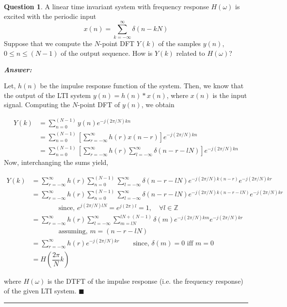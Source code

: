 \documentclass[12pt]{article}
\theoremstyle{definition}
\newtheorem{question}{Question}
\newenvironment{answer}{
    \textbf{\textit{Answer:}} \qquad
}{\hfill $\blacksquare$ \\ \begin{center}
    \rule{0.6\linewidth}{0.5px}    
\end{center}
}
\newcommand{\Z}{\mathbb{Z}}
\begin{document}
\begin{question}
    A linear time invariant system with frequency response $H(\omega)$ is excited with the periodic input 
    $$
    x(n) = \sum_{k = -\infty}^\infty \delta(n - kN)
    $$
    Suppose that we compute the $N$-point DFT $Y(k)$ of the samples $y(n)$, $0 \leq n \leq (N-1)$ of the output sequence. How is $Y(k)$ related to $H(\omega)$?
\end{question}

\begin{answer}
    Let, $h(n)$ be the impulse response function of the system. Then, we know that the output of the LTI system $y(n) = h(n) \ast x(n)$, where $x(n)$ is the input signal. Computing the $N$-point DFT of $y(n)$, we obtain 

    \begin{align*}
        Y(k)
        & = \sum_{n = 0}^{(N-1)} y(n) e^{-j(2\pi / N)kn}\\
        & = \sum_{n = 0}^{(N-1)} \left[\sum_{r = -\infty}^{\infty} h(r) x(n-r)\right] e^{-j(2\pi / N)kn}\\
        & = \sum_{n = 0}^{(N-1)} \left[\sum_{r = -\infty}^{\infty} h(r) \sum_{l = -\infty}^\infty \delta(n - r - lN)\right] e^{-j(2\pi / N)kn}
    \end{align*}
    Now, interchanging the sums yield,

    \begin{align*}
        Y(k) & = \sum_{r = -\infty}^{\infty} h(r) \sum_{n = 0}^{(N-1)} \sum_{l = -\infty}^\infty \delta(n - r - lN) e^{-j(2\pi / N)k(n - r)} e^{-j(2\pi / N)kr}\\
        & = \sum_{r = -\infty}^{\infty} h(r) \sum_{n = 0}^{(N-1)} \sum_{l = -\infty}^\infty \delta(n - r - lN) e^{-j(2\pi / N)k(n - r - lN)} e^{-j(2\pi / N)kr}\\
        & \qquad \qquad \text{since, } e^{j(2\pi/N) lN} = e^{j(2\pi)l} = 1, \quad \forall l \in \Z\\
        & = \sum_{r = -\infty}^{\infty} h(r) \sum_{l = -\infty}^\infty \sum_{m = lN}^{lN + (N-1)} \delta(m) e^{-j(2\pi/N)km} e^{-j(2\pi/N)kr}\\
        & \qquad \qquad \text{assuming, } m = (n - r - lN)\\
        & = \sum_{r = -\infty}^{\infty} h(r)e^{-j(2\pi/N)kr} \qquad \text{since, } \delta(m) = 0 \text{ iff } m = 0\\
        & = H\left( \dfrac{2\pi}{N}k \right)
    \end{align*}
    
    where $H(\omega)$ is the DTFT of the impulse response (i.e. the frequency response) of the given LTI system.
\end{answer}
\end{document}
